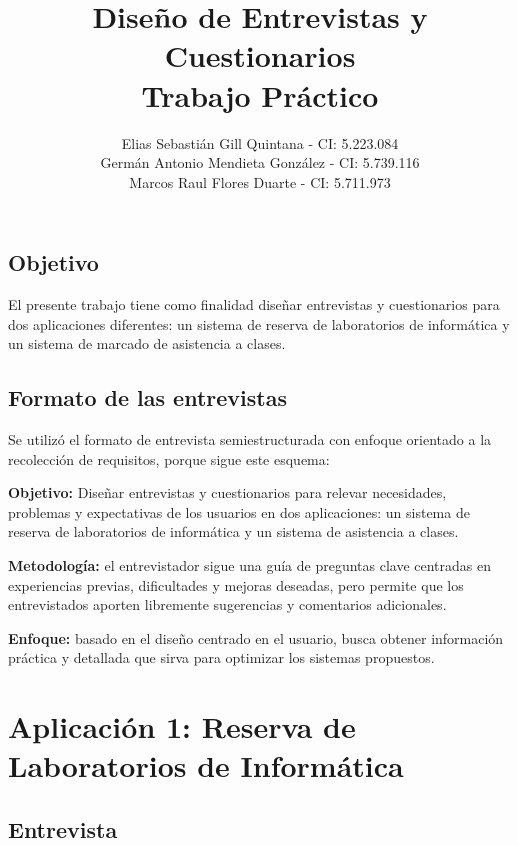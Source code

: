 \documentclass[12pt, a4paper]{article}
\title{\textbf{Diseño de Entrevistas y Cuestionarios} \\ \large Trabajo Práctico}
\author{
    Elias Sebastián Gill Quintana - CI: 5.223.084\\
        Germán Antonio Mendieta González - CI: 5.739.116\\
        Marcos Raul Flores Duarte - CI: 5.711.973
}
\date{}
\begin{document}
\maketitle

\subsection*{Objetivo}
El presente trabajo tiene como finalidad diseñar entrevistas y cuestionarios para dos aplicaciones diferentes: un sistema de reserva de laboratorios de informática y un sistema de marcado de asistencia a clases.

\subsection*{Formato de las entrevistas}

Se utilizó el formato de entrevista semiestructurada con enfoque orientado a la recolección de requisitos, porque sigue este esquema:

\textbf{Objetivo:} Diseñar entrevistas y cuestionarios para relevar necesidades, problemas y expectativas de los usuarios en dos aplicaciones: un sistema de reserva de laboratorios de informática y un sistema de asistencia a clases.

\textbf{Metodología:} el entrevistador sigue una guía de preguntas clave centradas en experiencias previas, dificultades y mejoras deseadas, pero permite que los entrevistados aporten libremente sugerencias y comentarios adicionales.

\textbf{Enfoque:} basado en el diseño centrado en el usuario, busca obtener información práctica y detallada que sirva para optimizar los sistemas propuestos.

\section{Aplicación 1: Reserva de Laboratorios de Informática}

\subsection{Entrevista}
\end{document}
